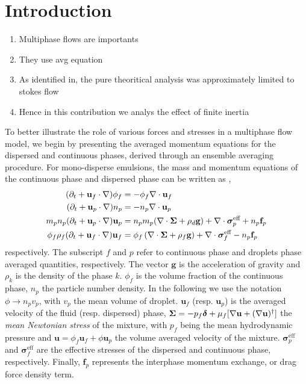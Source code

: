 \section{Introduction}


\begin{enumerate}
    \item Multiphase flows are importants 
    \item They use avg equation
    \item As identified in, \citet{fintzi2024averaged} the pure theoritical analysis was approximately limited to stokes flow 
    \item Hence in this contribution we analys the effect of finite inertia
\end{enumerate}
To better illustrate the role of various forces and stresses in a multiphase flow model, we begin by presenting the averaged momentum equations for the dispersed and continuous phases, derived through an ensemble averaging procedure.
For mono-disperse emulsions, the mass and momentum equations of the continuous phase and dispersed phase can be written as \citep{fintzi2024averaged},
\begin{align}
    \label{eq:dt_phif}
    (\pddt + \textbf{u}_f  \cdot \grad) \phi_f
    &= - \phi_f \div \textbf{u}_f\\
    (\pddt + \textbf{u}_p \cdot \grad)n_p
    &=
    - n_p \div \textbf{u}_p\\
    m_pn_p (\pddt + \textbf{u}_p \cdot \grad)\textbf{u}_p
    &=
    n_pm_p(\div \bm\Sigma
    + \rho_d  \textbf{g})
    + \div \bm\sigma_p^\text{eff}
    + n_p\textbf{f}_p
    \\
    \phi_f \rho_f(\pddt + \textbf{u}_f  \cdot \grad) \textbf{u}_f
    &= \phi_f 
    \left(\div \bm{\Sigma}
    + \rho_f \textbf{g}\right)
    + \div \bm\sigma_f^{\text{eff}}
    - n_p\textbf{f}_p
    \label{eq:dt_uf2}
\end{align}
respectively. 
The subscript $f$ and $p$ refer to continuous phase and droplets phase averaged quantities, respectively.
The vector $\textbf{g}$ is the acceleration of gravity and $\rho_k$ is the density of the phase $k$. 
$\phi_f$ is the volume fraction of the continuous phase, $n_p$ the particle number density.
In the following we use the notation $\phi \to n_p v_p$, with $v_p$ the mean volume of droplet.
$\textbf{u}_f$ (resp. $\textbf{u}_p$) is the averaged velocity of the fluid (resp. dispersed) phase, $\bm\Sigma = - p_f \bm\delta + \mu_f [\mathbf{\nabla} \textbf{u} +  (\mathbf{\nabla} \textbf{u})^\dagger ]$ the \textit{mean Newtonian stress} of the mixture, with $p_f$ being the mean hydrodynamic pressure and $\textbf{u}=\phi_f \textbf{u}_f + \phi \textbf{u}_p$ the volume averaged velocity of the mixture.
$\bm{\sigma}^{\text{eff}}_p$ and $\bm{\sigma}^{\text{eff}}_f$ are the effective stresses of the dispersed and continuous phase, respectively.  
Finally, $\textbf{f}_p$ represents the interphase momentum exchange, or drag force density term. 


